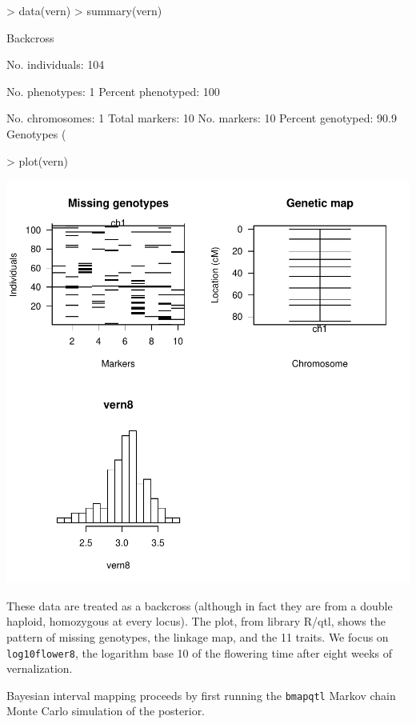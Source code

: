 \documentclass{article}
\begin{document}
\begin{Schunk}
\begin{Sinput}
> data(vern)
> summary(vern)
\end{Sinput}
\begin{Soutput}
    Backcross

    No. individuals:  104 

    No. phenotypes:   1 
    Percent phenotyped:  100 

    No. chromosomes:  1 
    Total markers:    10 
    No. markers:      10 
    Percent genotyped:  90.9 
    Genotypes (%
\end{Soutput}
\begin{Sinput}
> plot(vern)
\end{Sinput}
\end{Schunk}
\includegraphics{bim-003}

These data are treated as a backcross (although in fact they are from
a double haploid, homozygous at every locus). The plot, from library
R/qtl, shows the pattern of missing genotypes, the linkage map, and
the 11 traits. We focus on \texttt{log10flower8}, the logarithm base
10 of the flowering time after eight weeks of vernalization.

Bayesian interval mapping proceeds by first running the
\texttt{bmapqtl} Markov chain Monte Carlo simulation of the posterior.
\end{document}
